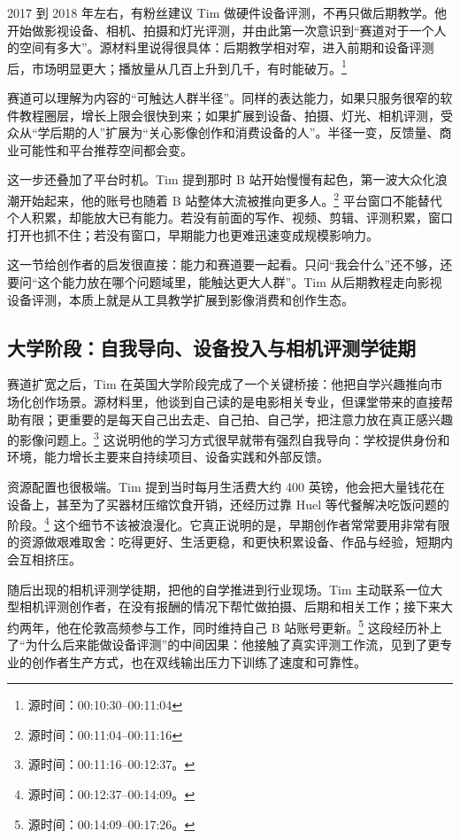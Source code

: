 2017 到 2018 年左右，有粉丝建议 Tim 做硬件设备评测，不再只做后期教学。他开始做影视设备、相机、拍摄和灯光评测，并由此第一次意识到“赛道对于一个人的空间有多大”。源材料里说得很具体：后期教学相对窄，进入前期和设备评测后，市场明显更大；播放量从几百上升到几千，有时能破万。\footnote{源时间：00:10:30--00:11:04}

赛道可以理解为内容的“可触达人群半径”。同样的表达能力，如果只服务很窄的软件教程圈层，增长上限会很快到来；如果扩展到设备、拍摄、灯光、相机评测，受众从“学后期的人”扩展为“关心影像创作和消费设备的人”。半径一变，反馈量、商业可能性和平台推荐空间都会变。

这一步还叠加了平台时机。Tim 提到那时 B 站开始慢慢有起色，第一波大众化浪潮开始起来，他的账号也随着 B 站整体大流被推向更多人。\footnote{源时间：00:11:04--00:11:16} 平台窗口不能替代个人积累，却能放大已有能力。若没有前面的写作、视频、剪辑、评测积累，窗口打开也抓不住；若没有窗口，早期能力也更难迅速变成规模影响力。

这一节给创作者的启发很直接：能力和赛道要一起看。只问“我会什么”还不够，还要问“这个能力放在哪个问题域里，能触达更大人群”。Tim 从后期教程走向影视设备评测，本质上就是从工具教学扩展到影像消费和创作生态。

\subsection{大学阶段：自我导向、设备投入与相机评测学徒期}

赛道扩宽之后，Tim 在英国大学阶段完成了一个关键桥接：他把自学兴趣推向市场化创作场景。源材料里，他谈到自己读的是电影相关专业，但课堂带来的直接帮助有限；更重要的是每天自己出去走、自己拍、自己学，把注意力放在真正感兴趣的影像问题上。\footnote{源时间：00:11:16--00:12:37。} 这说明他的学习方式很早就带有强烈自我导向：学校提供身份和环境，能力增长主要来自持续项目、设备实践和外部反馈。

资源配置也很极端。Tim 提到当时每月生活费大约 400 英镑，他会把大量钱花在设备上，甚至为了买器材压缩饮食开销，还经历过靠 Huel 等代餐解决吃饭问题的阶段。\footnote{源时间：00:12:37--00:14:09。} 这个细节不该被浪漫化。它真正说明的是，早期创作者常常要用非常有限的资源做艰难取舍：吃得更好、生活更稳，和更快积累设备、作品与经验，短期内会互相挤压。

随后出现的相机评测学徒期，把他的自学推进到行业现场。Tim 主动联系一位大型相机评测创作者，在没有报酬的情况下帮忙做拍摄、后期和相关工作；接下来大约两年，他在伦敦高频参与工作，同时维持自己 B 站账号更新。\footnote{源时间：00:14:09--00:17:26。} 这段经历补上了“为什么后来能做设备评测”的中间因果：他接触了真实评测工作流，见到了更专业的创作者生产方式，也在双线输出压力下训练了速度和可靠性。

